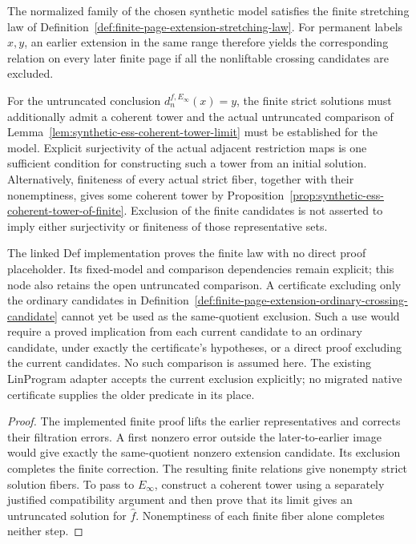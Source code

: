 \begin{corollary}
  \label{cor:page-extension-stretch}
  \notready
  The normalized family of the chosen synthetic model satisfies the finite
  stretching law of
  Definition~\ref{def:finite-page-extension-stretching-law}.
  For permanent labels $x,y$, an earlier extension in the same range
  therefore yields the corresponding relation on every later finite page
  if all the nonliftable crossing candidates are excluded.

  For the untruncated conclusion $d_n^{f,E_\infty}(x)=y$, the finite
  strict solutions must additionally admit a coherent tower and the
  actual untruncated comparison of
  Lemma~\ref{lem:synthetic-ess-coherent-tower-limit} must be established
  for the model.  Explicit surjectivity of the actual adjacent restriction
  maps is one sufficient condition for constructing such a tower from an
  initial solution.  Alternatively, finiteness of every actual strict
  fiber, together with their nonemptiness, gives some coherent tower by
  Proposition~\ref{prop:synthetic-ess-coherent-tower-of-finite}.
  Exclusion of the finite candidates is not asserted to imply either
  surjectivity or finiteness of those representative sets.

  The linked Def implementation proves the finite law with no direct
  proof placeholder. Its fixed-model and comparison dependencies remain
  explicit; this node also retains the open untruncated comparison.
  A certificate excluding only the ordinary candidates in
  Definition~\ref{def:finite-page-extension-ordinary-crossing-candidate}
  cannot yet be used as the same-quotient exclusion. Such a use would
  require a proved implication from each current candidate to an ordinary
  candidate, under exactly the certificate's hypotheses, or a direct proof
  excluding the current candidates. No such comparison is assumed here.
  The existing LinProgram adapter accepts the current exclusion explicitly;
  no migrated native certificate supplies the older predicate in its place.
\end{corollary}

\begin{proof}
  The implemented finite proof lifts the earlier representatives and
  corrects their filtration errors. A first nonzero error outside the
  later-to-earlier image would give exactly the same-quotient nonzero
  extension candidate. Its exclusion completes the finite correction.
  The resulting finite relations give nonempty strict solution fibers.  To pass to $E_\infty$, construct a
  coherent tower using a separately justified compatibility argument and
  then prove that its limit gives an untruncated solution for $\widehat f$.
  Nonemptiness of each finite fiber alone completes neither step.
\end{proof}

